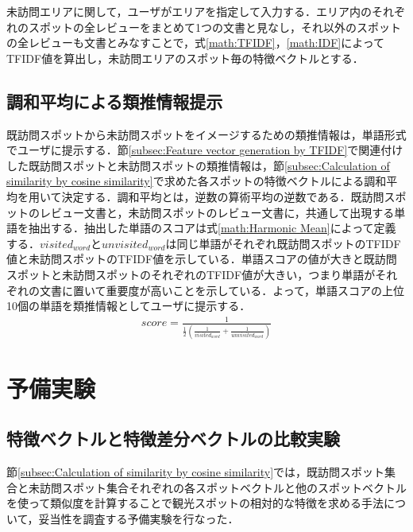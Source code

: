 \documentclass{deimj}
\begin{document}
未訪問エリアに関して，ユーザがエリアを指定して入力する．エリア内のそれぞれのスポットの全レビューをまとめて1つの文書と見なし，それ以外のスポットの全レビューも文書とみなすことで，式\ref{math:TFIDF}，\ref{math:IDF}によってTFIDF値を算出し，未訪問エリアのスポット毎の特徴ベクトルとする．

\subsection{調和平均による類推情報提示}
\label{subsec:Presenting similar information by harmonic mean}
既訪問スポットから未訪問スポットをイメージするための類推情報は，単語形式でユーザに提示する．節\ref{subsec:Feature vector generation by TFIDF}で関連付けした既訪問スポットと未訪問スポットの類推情報は，節\ref{subsec:Calculation of similarity by cosine similarity}で求めた各スポットの特徴ベクトルによる調和平均を用いて決定する．調和平均とは，逆数の算術平均の逆数である．既訪問スポットのレビュー文書と，未訪問スポットのレビュー文書に，共通して出現する単語を抽出する．抽出した単語のスコアは式\ref{math:Harmonic Mean}によって定義する．$visited_{word}$と$unvisited_{word}$は同じ単語がそれぞれ既訪問スポットのTFIDF値と未訪問スポットのTFIDF値を示している．単語スコアの値が大きと既訪問スポットと未訪問スポットのそれぞれのTFIDF値が大きい，つまり単語がそれぞれの文書に置いて重要度が高いことを示している．よって，単語スコアの上位10個の単語を類推情報としてユーザに提示する．
\begin{eqnarray}
  score=\frac{1}{\frac{1}{2}(\frac{1}{visited_{word}}+\frac{1}{unvisited_{word}})}
  \label{math:Harmonic Mean}
\end{eqnarray}

\section{予備実験}
\label{sec:Preliminary Experiment}
\subsection{特徴ベクトルと特徴差分ベクトルの比較実験}
\label{subsec:A comparison experiment between feature vector and feature vector difference}
節\ref{subsec:Calculation of similarity by cosine similarity}では，既訪問スポット集合と未訪問スポット集合それぞれの各スポットベクトルと他のスポットベクトルを使って類似度を計算することで観光スポットの相対的な特徴を求める手法について，妥当性を調査する予備実験を行なった．
\end{document}
